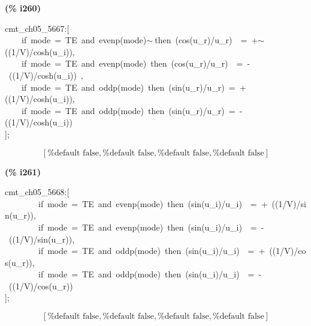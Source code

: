 \documentclass[fleqn]{article}
\begin{document}
\noindent
\begin{minipage}[t]{4.000000em}\color{red}\bfseries
(\% i260)	
\end{minipage}
\begin{minipage}[t]{\textwidth}\color{blue}
cmt\_ch05\_5667:[\\
\ \ \ \ if\ mode\ =\ TE\ and\ evenp(mode)\ensuremath{\sim\ }then\ (cos(u\_r)/u\_r)\ \ =\ +\ensuremath{\sim\ }((1/V)/cosh(u\_i)),\\
\ \ \ \ if\ mode\ =\ TE\ and\ evenp(mode)\ then\ (cos(u\_r)/u\_r)\ \ =\ -\ ((1/V)/cosh(u\_i))\ ,\ \ \ \\
\ \ \ \ if\ mode\ =\ TE\ and\ oddp(mode)\ then\ (sin(u\_r)/u\_r)\ =\ +((1/V)/cosh(u\_i)),\\
\ \ \ \ if\ mode\ =\ TE\ and\ oddp(mode)\ then\ (sin(u\_r)/u\_r)\ =\ -((1/V)/cosh(u\_i))\\
];
\end{minipage}
\[\displaystyle \tag{\% o260} 
\left[ \mbox{%
false}\operatorname{,}\mbox{%
false}\operatorname{,}\mbox{%
false}\operatorname{,}\mbox{%
false}\right] \mbox{}
\]


\noindent
\begin{minipage}[t]{4.000000em}\color{red}\bfseries
(\% i261)	
\end{minipage}
\begin{minipage}[t]{\textwidth}\color{blue}
cmt\_ch05\_5668:[\\
\ \ \ \ \ \ \ \ if\ mode\ =\ TE\ and\ evenp(mode)\ then\ (sin(u\_i)/u\_i)\ \ =\ +\ ((1/V)/sin(u\_r)),\\
\ \ \ \ \ \ \ \ if\ mode\ =\ TE\ and\ evenp(mode)\ then\ (sin(u\_i)/u\_i)\ \ =\ -\ ((1/V)/sin(u\_r)),\\
\ \ \ \ \ \ \ \ if\ mode\ =\ TE\ and\ oddp(mode)\ then\ (sin(u\_i)/u\_i)\ \ =\ +\ ((1/V)/cos(u\_r)),\\
\ \ \ \ \ \ \ \ if\ mode\ =\ TE\ and\ oddp(mode)\ then\ (sin(u\_i)/u\_i)\ \ =\ -\ ((1/V)/cos(u\_r))\\
];
\end{minipage}
\[\displaystyle \tag{\% o261} 
\left[ \mbox{%
false}\operatorname{,}\mbox{%
false}\operatorname{,}\mbox{%
false}\operatorname{,}\mbox{%
false}\right] \mbox{}
\]
\end{document}
